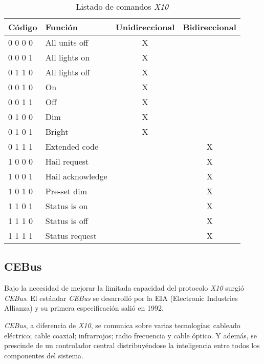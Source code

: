\begin{table}[!hbt]
    \begin{center}
        \begin{tabular}{|l |l | c | c |}
            \hline
            Código & Función & Unidireccional & Bidireccional \\
            \hline
            0 0 0 0 & All units off & X &  \\
            \hline
            0 0 0 1 & All lights on & X &  \\
            \hline
            0 1 1 0 & All lights off & X &  \\
            \hline
            0 0 1 0 & On & X &  \\
            \hline
            0 0 1 1 & Off & X &  \\
            \hline
            0 1 0 0 & Dim & X &  \\
            \hline
            0 1 0 1 & Bright & X &  \\
            \hline
            0 1 1 1 & Extended code & & X \\
            \hline
            1 0 0 0 & Hail request & & X \\
            \hline
            1 0 0 1 & Hail acknowledge & & X \\
            \hline
            1 0 1 0 & Pre-set dim & & X \\
            \hline
            1 1 0 1 & Status is on & & X \\
            \hline
            1 1 1 0 & Status is off & & X \\
            \hline
            1 1 1 1 & Status request & & X \\
            \hline
        \end{tabular}
        \caption{Listado de comandos \emph{X10}}
    \end{center}
\end{table}

\subsection{CEBus}

Bajo la necesidad de mejorar la limitada capacidad del protocolo \emph{X10} surgió \emph{CEBus}. El estándar \emph{CEBus} se desarrolló por la EIA (Electronic Industries Allianza) y su primera especificación salió en 1992.

\emph{CEBus}, a diferencia de \emph{X10}, se comunica sobre varias tecnologías; cableado eléctrico; cable coaxial; infrarrojos; radio frecuencia y cable óptico. Y además, se prescinde de un controlador central distribuyéndose la inteligencia entre todos los componentes del sistema.

